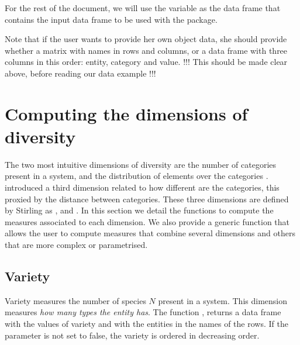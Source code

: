 For the rest of the document, we will use the variable  as the data frame that contains the input data frame to be used with the package.

Note that if the user wants to provide her own object data, she should provide whether a matrix with names in rows and columns, or a data frame with three columns in this order: entity, category and value.  !!! This should be made clear above, before reading our data example !!! 




\section{Computing the dimensions of diversity}
The two most intuitive dimensions of diversity are the number of categories present in a system, and the distribution of elements over the categories \citep{mcdonald_conceptualization_2003}. 
\citet{stirling_general_2007} introduced a third dimension related to how different are the categories, this proxied by the distance between categories. 
These three dimensions are defined by Stirling as ,  and . 
In this section we detail the functions to compute the measures associated to each dimension. We also provide a generic function that allows the user to compute measures that combine several dimensions and others that are more complex or parametrised.

\subsection{Variety}
Variety measures the number of species $N$ present in a system. This dimension measures \emph{how many types the entity has}. The function , returns a data frame with the values of variety and with the entities in the names of the rows. If the parameter  is not set to false, the variety is ordered in decreasing order.


